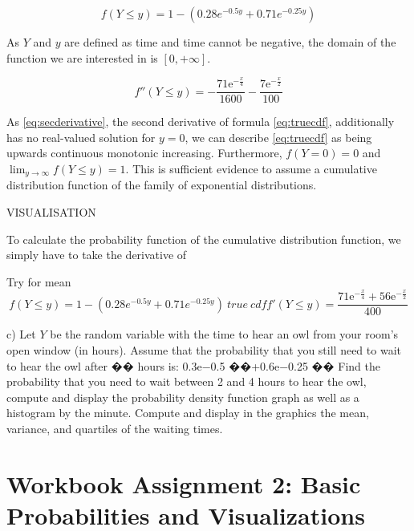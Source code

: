 \begin{equation}  f(Y \leq y) =1-( 0.28e^{-0.5y} + 0.71e^{-0.25y})
\label{eq:truecdf}
\end{equation}

As $Y$ and $y$ are defined as time and time cannot be negative, the domain of the function we are interested in is $[0,+\infty]$.

\begin{equation} f''(Y \leq y) = -\frac{71\mathrm{e}^{-\frac{x}{4}}}{1600}-\frac{7\mathrm{e}^{-\frac{x}{2}}}{100}
\label{eq:secderivative}
\end{equation}

As \ref{eq:secderivative}, the second derivative of formula \ref{eq:truecdf},  additionally has no real-valued solution for $y=0$, we can describe \ref{eq:truecdf} as being upwards continuous monotonic increasing. Furthermore, $f(Y = 0) = 0$ and $\lim_{y\to\infty} f(Y \leq y) = 1$. This is sufficient evidence to assume a cumulative distribution function of the family of exponential distributions. 

VISUALISATION

To calculate the probability function of the cumulative distribution function, we simply have to take the derivative of 


Try for mean
\begin{equation}  
f(Y \leq y) = 1-( 0.28e^{-0.5y} + 0.71e^{-0.25y}) ~true~cdf 

f'(Y \leq y) = \frac{71\mathrm{e}^{-\frac{x}{4}}+56\mathrm{e}^{-\frac{x}{2}}}{400}

\label{eq:try}
\end{equation}


c) Let $Y$ be the random variable with the time to hear an owl from your room’s open window (in hours). Assume that the probability that you still need to wait to hear the owl after �� hours is:
0.3e−0.5 ��+0.6e−0.25 ��
Find the probability that you need to wait between 2 and 4 hours to hear the owl, compute and display the probability density function graph as well as a histogram by the minute. Compute and display in the graphics the mean, variance, and quartiles of the waiting times.

\chapter{Workbook Assignment 2: Basic Probabilities and Visualizations }	

